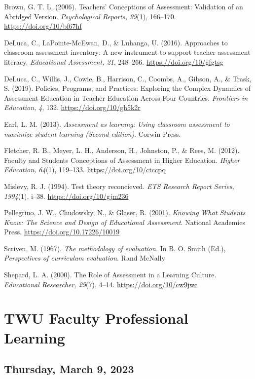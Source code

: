 \documentclass[
]{book}
\begin{document}
Brown, G. T. L. (2006). Teachers' Conceptions of Assessment: Validation of an Abridged Version. \emph{Psychological Reports, 99}(1), 166--170. \url{https://doi.org/10/bf67hf}

DeLuca, C., LaPointe-McEwan, D., \& Luhanga, U. (2016). Approaches to classroom assessment inventory: A new instrument to support teacher assessment literacy. \emph{Educational Assessment, 21}, 248--266. \url{https://doi.org/10/gfgtsg}

DeLuca, C., Willis, J., Cowie, B., Harrison, C., Coombs, A., Gibson, A., \& Trask, S. (2019). Policies, Programs, and Practices: Exploring the Complex Dynamics of Assessment Education in Teacher Education Across Four Countries. \emph{Frontiers in Education, 4}, 132. \url{https://doi.org/10/gh5k2r}

Earl, L. M. (2013). \emph{Assessment as learning: Using classroom assessment to maximize student learning (Second edition)}. Corwin Press.

Fletcher, R. B., Meyer, L. H., Anderson, H., Johnston, P., \& Rees, M. (2012). Faculty and Students Conceptions of Assessment in Higher Education. \emph{Higher Education, 64}(1), 119--133. \url{https://doi.org/10/ctccpq}

Mislevy, R. J. (1994). Test theory reconcieved. \emph{ETS Research Report Series, 1994}(1), i--38. \url{https://doi.org/10/gjm236}

Pellegrino, J. W., Chudowsky, N., \& Glaser, R. (2001). \emph{Knowing What Students Know: The Science and Design of Educational Assessment}. National Academies Press. \url{https://doi.org/10.17226/10019}

Scriven, M. (1967). \emph{The methodology of evaluation.} In B. O. Smith (Ed.), \emph{Perspectives of curriculum evaluation}. Rand McNally

Shepard, L. A. (2000). The Role of Assessment in a Learning Culture. \emph{Educational Researcher, 29}(7), 4--14. \url{https://doi.org/10/cw9jwc}

\hypertarget{twu-faculty-professional-learning}{%
\chapter*{TWU Faculty Professional Learning}\label{twu-faculty-professional-learning}}

\hypertarget{thursday-march-9-2023}{%
\section*{Thursday, March 9, 2023}\label{thursday-march-9-2023}}
\end{document}
